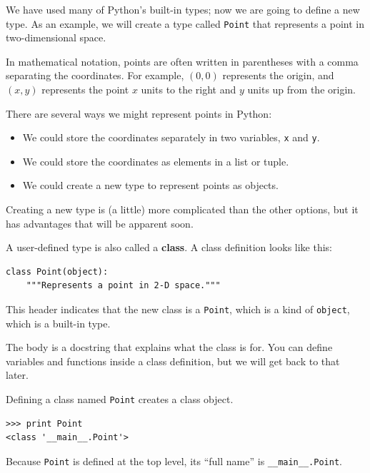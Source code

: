 \documentclass[10pt]{book}
\begin{document}
\begin{CJK}{UTF8}{gbsn}
We have used many of Python's built-in types; now we are going
to define a new type.  As an example, we will create a type
called {\tt Point} that represents a point in two-dimensional
space.

In mathematical notation, points are often written in
parentheses with a comma separating the coordinates. For example,
$(0,0)$ represents the origin, and $(x,y)$ represents the
point $x$ units to the right and $y$ units up from the origin.

There are several ways we might represent points in Python:

\begin{itemize}

\item We could store the coordinates separately in two
variables, {\tt x} and {\tt y}.

\item We could store the coordinates as elements in a list
or tuple.

\item We could create a new type to represent points as
objects.

\end{itemize}

Creating a new type
is (a little) more complicated than the other options, but
it has advantages that will be apparent soon.

A user-defined type is also called a {\bf class}.
A class definition looks like this:

\begin{verbatim}
class Point(object):
    """Represents a point in 2-D space."""
\end{verbatim}
%
This header indicates that the new class is a {\tt Point},
which is a kind of {\tt object}, which is a built-in
type.

The body is a docstring that explains what the class is for.
You can define variables and functions inside a class definition,
but we will get back to that later.

Defining a class named {\tt Point} creates a class object.

\begin{verbatim}
>>> print Point
<class '__main__.Point'>
\end{verbatim}
%
Because {\tt Point} is defined at the top level, its ``full
name'' is \verb"__main__.Point".


\end{CJK}
\end{document}

